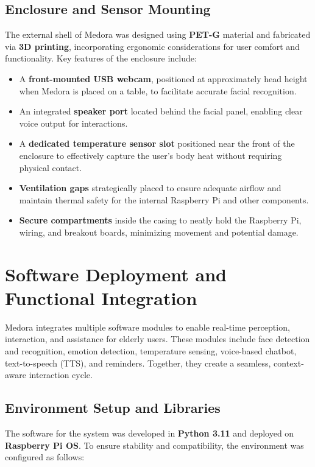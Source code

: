 \subsection{ Enclosure and Sensor Mounting}

The external shell of Medora was designed using \textbf{PET-G} material and fabricated via \textbf{3D printing}, incorporating ergonomic considerations for user comfort and functionality. Key features of the enclosure include:

\begin{itemize}
    \item A \textbf{front-mounted USB webcam}, positioned at approximately head height when Medora is placed on a table, to facilitate accurate facial recognition.
    \item An integrated \textbf{speaker port} located behind the facial panel, enabling clear voice output for interactions.
    \item A \textbf{dedicated temperature sensor slot} positioned near the front of the enclosure to effectively capture the user's body heat without requiring physical contact.
    \item \textbf{Ventilation gaps} strategically placed to ensure adequate airflow and maintain thermal safety for the internal Raspberry Pi and other components.
    \item \textbf{Secure compartments} inside the casing to neatly hold the Raspberry Pi, wiring, and breakout boards, minimizing movement and potential damage.
\end{itemize}




\section{Software Deployment and Functional Integration}
Medora integrates multiple software modules to enable real-time perception, 
interaction, and assistance for elderly users. These modules include face detection 
and recognition, emotion detection, temperature sensing, voice-based chatbot, 
text-to-speech (TTS), and reminders. Together, they create a seamless, 
context-aware interaction cycle.

\subsection{Environment Setup and Libraries}

The software for the system was developed in \textbf{Python 3.11} and deployed on 
\textbf{Raspberry Pi OS}. To ensure stability and compatibility, the environment 
was configured as follows:

